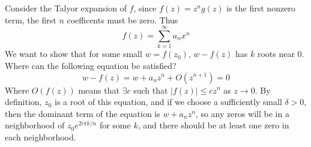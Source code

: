 \documentclass{homework}
\begin{document}
                                                                                                                  \begin{solution}
                                                                                                                  Consider the Talyor expansion of $f$, since $f(z)=z^ng(z)$ is the first nonzero term, the first $n$ coefficents must be zero. Thus 
                                                                                                                  \[
                                                                                                                  f(z) = \sum_{k=1}^\infty a_nx^n
                                                                                                                  \]
                                                                                                                  We want to show that for some small $w=f(z_0)$, $w - f(z)$ has $k$ roots near 0. Where can the following equation be satisfied?
                                                                                                                  \[
                                                                                                                  w - f(z) = w + a_nz^n + O(z^{n+1}) = 0
                                                                                                                  \]
                                                                                                                  Where $O(f(z))$ means that $\exists c$ such that $|f(z)|\leq cz^n$ as $z\to 0$.
                                                                                                                  By definition, $z_0$ is a root of this equation, and if we choose a sufficiently small $\delta>0$, then the dominant term of the equation is $w + a_nz^n$, so any zeros will be in a neighborhood of $z_0e^{2i\pi k/n}$ for some $k$, and there should be at least one zero in each neighborhood. %


\end{solution}
\end{document}
